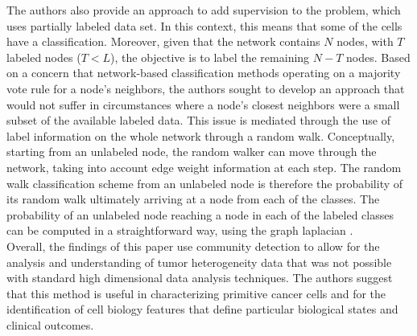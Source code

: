 \indent The authors also provide an approach to add supervision to the problem, which uses partially labeled data set. In this context, this means that some of the cells have a classification. Moreover, given that the network contains $N$ nodes, with $T$ labeled nodes ($T<L$), the objective is to label the remaining $N-T$ nodes. Based on a concern that network-based classification methods operating on a majority vote rule for a node's neighbors, the authors sought to develop an approach that would not suffer in circumstances where a node's closest neighbors were a small subset of the available labeled data. This issue is mediated through the use of label information on the whole network through a random walk. Conceptually, starting from an unlabeled node, the random walker can move through the network, taking into account edge weight information at each step. The random walk classification scheme from an unlabeled node is therefore the probability of its random walk ultimately arriving at a node from each of the classes.  The probability of an unlabeled node reaching a node in each of the labeled classes can be computed in a straightforward way, using the graph laplacian \cite{RWR}. \\
\indent Overall, the findings of this paper use community detection to allow for the analysis and understanding of tumor heterogeneity data that was not possible with standard high dimensional data analysis techniques.  The authors suggest that this method is useful in characterizing primitive cancer cells and for the identification of cell biology features that define particular biological states and clinical outcomes. 

